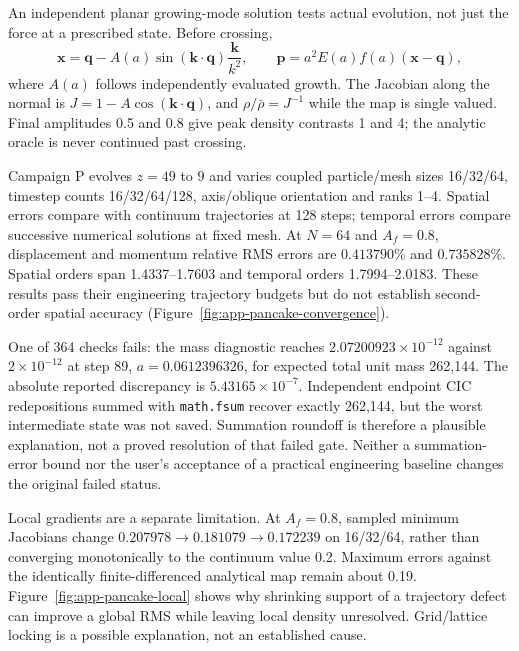 An independent planar growing-mode solution tests actual evolution, not just
the force at a prescribed state.  Before crossing,
\begin{equation}
 \boldsymbol x=\boldsymbol q-
 A(a)\sin(\boldsymbol k\cdot\boldsymbol q)\frac{\boldsymbol k}{k^2},
 \qquad
 \boldsymbol p=a^2E(a)f(a)(\boldsymbol x-\boldsymbol q),
 \label{eq:app-pancake}
\end{equation}
where $A(a)$ follows independently evaluated growth.  The Jacobian along the
normal is $J=1-A\cos(\boldsymbol k\cdot\boldsymbol q)$, and
$\rho/\bar\rho=J^{-1}$ while the map is single valued.  Final amplitudes 0.5
and 0.8 give peak density contrasts 1 and 4; the analytic oracle is never
continued past crossing.

Campaign P evolves $z=49$ to $9$ and varies coupled particle/mesh sizes
16/32/64, timestep counts 16/32/64/128, axis/oblique orientation and ranks 1--4.
Spatial errors compare with continuum trajectories at 128 steps; temporal
errors compare successive numerical solutions at fixed mesh.  At $N=64$ and
$A_f=0.8$, displacement and momentum relative RMS errors are
$0.413790\%$ and $0.735828\%$.  Spatial orders span 1.4337--1.7603 and temporal
orders 1.7994--2.0183.  These results pass their engineering trajectory budgets
but do not establish second-order spatial accuracy
(Figure~\ref{fig:app-pancake-convergence}).

One of 364 checks fails: the mass diagnostic reaches
$2.07200923\times10^{-12}$ against $2\times10^{-12}$ at step 89,
$a=0.0612396326$, for expected total unit mass 262,144.  The absolute reported
discrepancy is $5.43165\times10^{-7}$.  Independent endpoint CIC redepositions
summed with \texttt{math.fsum} recover exactly 262,144, but the worst intermediate
state was not saved.  Summation roundoff is therefore a plausible explanation,
not a proved resolution of that failed gate.  Neither a summation-error bound
nor the user's acceptance of a practical engineering baseline changes the
original failed status.

Local gradients are a separate limitation.  At $A_f=0.8$, sampled minimum
Jacobians change $0.207978\to0.181079\to0.172239$ on 16/32/64, rather than
converging monotonically to the continuum value 0.2.  Maximum errors against
the identically finite-differenced analytical map remain about 0.19.
Figure~\ref{fig:app-pancake-local} shows why shrinking support of a trajectory
defect can improve a global RMS while leaving local density unresolved.
Grid/lattice locking is a possible explanation, not an established cause.

